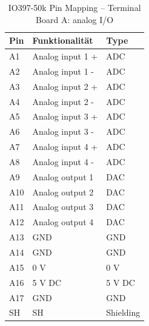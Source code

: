 \pagebreak[1]
\begin{table}[!ht]
	\centering
	\caption{IO397-50k Pin Mapping – Terminal Board A: analog I/O \cite[15]{speedgoat:IO397_50k}}
	\label{IO397_50k:tab:Board_A}
	\begin{tabular}{lll}
		\hline
		\textbf{Pin}             & \textbf{Funktionalität} & \textbf{Type} \\ \hline
		\multicolumn{1}{l|}{A1}  & Analog input 1 +        & ADC           \\
		\multicolumn{1}{l|}{A2}  & Analog input 1 -        & ADC           \\
		\multicolumn{1}{l|}{A3}  & Analog input 2 +        & ADC           \\
		\multicolumn{1}{l|}{A4}  & Analog input 2 -        & ADC           \\
		\multicolumn{1}{l|}{A5}  & Analog input 3 +        & ADC           \\
		\multicolumn{1}{l|}{A6}  & Analog input 3 -        & ADC           \\
		\multicolumn{1}{l|}{A7}  & Analog input 4 +        & ADC           \\
		\multicolumn{1}{l|}{A8}  & Analog input 4 -        & ADC           \\ \hline
		\multicolumn{1}{l|}{A9}  & Analog output 1         & DAC           \\
		\multicolumn{1}{l|}{A10} & Analog output 2         & DAC           \\
		\multicolumn{1}{l|}{A11} & Analog output 3         & DAC           \\
		\multicolumn{1}{l|}{A12} & Analog output 4         & DAC           \\ \hline
		\multicolumn{1}{l|}{A13} & GND                     & GND           \\
		\multicolumn{1}{l|}{A14} & GND                     & GND           \\
		\multicolumn{1}{l|}{A15} & 0 V                     & 0 V           \\
		\multicolumn{1}{l|}{A16} & 5 V DC                  & 5 V DC        \\
		\multicolumn{1}{l|}{A17} & GND                     & GND           \\
		\multicolumn{1}{l|}{SH}  & SH                      & Shielding     \\ \hline
	\end{tabular}
\end{table}
\pagebreak[1]


